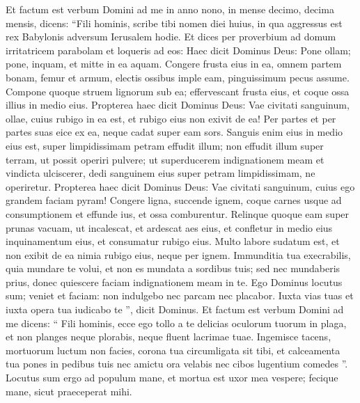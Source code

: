 \begin{biblechapter}
\begin{biblechapter}
\begin{biblechapter}
\begin{biblechapter}
\begin{biblechapter}
\begin{biblechapter}
\begin{biblechapter}
\begin{biblechapter}
\begin{biblechapter}
\begin{biblechapter}
\begin{biblechapter}
\begin{biblechapter}
\begin{biblechapter}
\begin{biblechapter}
\begin{biblechapter}
\begin{biblechapter}
\begin{biblechapter}
\begin{biblechapter}
\begin{biblechapter}
\begin{biblechapter}
\begin{biblechapter}
\begin{biblechapter}
\begin{biblechapter}
\begin{biblechapter}
\verse Et factum est verbum Domini ad me in anno nono, in mense decimo, decima mensis, dicens: 
\verse “Fili hominis, scribe tibi nomen diei huius, in qua aggressus est rex Babylonis adversum Ierusalem hodie. 
\verse Et dices per proverbium ad domum irritatricem parabolam et loqueris ad eos: Haec dicit Dominus Deus:
 Pone ollam; pone, inquam,
 et mitte in ea aquam.
 \verse Congere frusta eius in ea,
 omnem partem bonam, femur et armum,
 electis ossibus imple eam,
 \verse pinguissimum pecus assume.
 Compone quoque struem lignorum sub ea;
 effervescant frusta eius,
 et coque ossa illius in medio eius.
 \verse Propterea haec dicit Dominus Deus:
 Vae civitati sanguinum,
 ollae, cuius rubigo in ea est,
 et rubigo eius non exivit de ea!
 Per partes et per partes suas eice ex ea,
 neque cadat super eam sors.
 \verse Sanguis enim eius in medio eius est,
 super limpidissimam petram effudit illum;
 non effudit illum super terram,
 ut possit operiri pulvere;
 \verse ut superducerem indignationem meam
 et vindicta ulciscerer,
 dedi sanguinem eius
 super petram limpidissimam, ne operiretur.
 \verse Propterea haec dicit Dominus Deus:
 Vae civitati sanguinum,
 cuius ego grandem faciam pyram!
 \verse Congere ligna, succende ignem,
 coque carnes usque ad consumptionem
 et effunde ius,
 et ossa comburentur.
 \verse Relinque quoque eam super prunas vacuam,
 ut incalescat, et ardescat aes eius,
 et confletur in medio eius inquinamentum eius,
 et consumatur rubigo eius.
 \verse Multo labore sudatum est,
 et non exibit de ea nimia rubigo eius,
 neque per ignem.
 \verse Immunditia tua execrabilis, quia mundare te volui, et non es mundata a sordibus tuis; sed nec mundaberis prius, donec quiescere faciam indignationem meam in te. 
\verse Ego Dominus locutus sum; veniet et faciam: non indulgebo nec parcam nec placabor. Iuxta vias tuas et iuxta opera tua iudicabo te ”, dicit Dominus.
 \verse Et factum est verbum Domini ad me dicens: 
\verse “ Fili hominis, ecce ego tollo a te delicias oculorum tuorum in plaga, et non planges neque plorabis, neque fluent lacrimae tuae. 
\verse Ingemisce tacens, mortuorum luctum non facies, corona tua circumligata sit tibi, et calceamenta tua pones in pedibus tuis nec amictu ora velabis nec cibos lugentium comedes ”. 
\verse Locutus sum ergo ad populum mane, et mortua est uxor mea vespere; fecique mane, sicut praeceperat mihi. 

\end{biblechapter}
\end{biblechapter}
\end{biblechapter}
\end{biblechapter}
\end{biblechapter}
\end{biblechapter}
\end{biblechapter}
\end{biblechapter}
\end{biblechapter}
\end{biblechapter}
\end{biblechapter}
\end{biblechapter}
\end{biblechapter}
\end{biblechapter}
\end{biblechapter}
\end{biblechapter}
\end{biblechapter}
\end{biblechapter}
\end{biblechapter}
\end{biblechapter}
\end{biblechapter}
\end{biblechapter}
\end{biblechapter}
\end{biblechapter}
